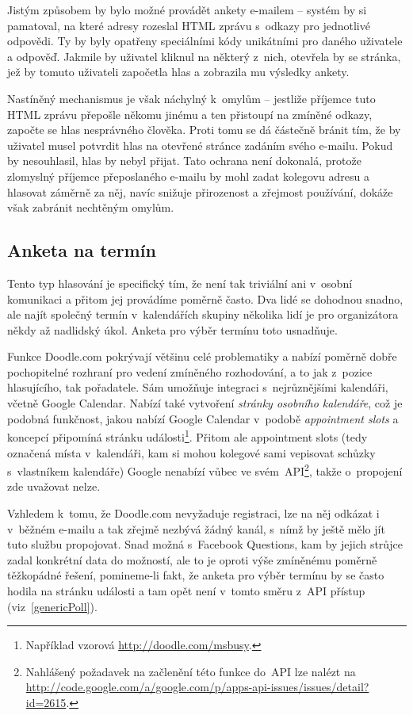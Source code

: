 \documentclass[12pt,oneside,final]{fithesis2}
\begin{document}
Jistým způsobem by bylo možné provádět ankety e-mailem -- systém by si pamatoval, na které adresy rozeslal HTML zprávu s~odkazy pro jednotlivé odpovědi. Ty by byly opatřeny speciálními kódy unikátními pro daného uživatele a odpověď. Jakmile by uživatel kliknul na některý z~nich, otevřela by se stránka, jež by tomuto uživateli započetla hlas a zobrazila mu výsledky ankety.

Nastíněný mechanismus je však náchylný k~omylům -- jestliže příjemce tuto HTML zprávu přepošle někomu jinému a ten přistoupí na zmíněné odkazy, započte se hlas nesprávného člověka. Proti tomu se dá částečně bránit tím, že by uživatel musel potvrdit hlas na otevřené stránce zadáním svého e-mailu. Pokud by nesouhlasil, hlas by nebyl přijat. Tato ochrana není dokonalá, protože zlomyslný příjemce přeposlaného e-mailu by mohl zadat kolegovu adresu a hlasovat záměrně za něj, navíc snižuje přirozenost a zřejmost používání, dokáže však zabránit nechtěným omylům.

\subsection{Anketa na termín}\label{datePoll}
Tento typ hlasování je specifický tím, že není tak triviální ani v~osobní komunikaci a přitom jej provádíme poměrně často. Dva lidé se dohodnou snadno, ale najít společný termín v~kalendářích skupiny několika lidí je pro organizátora někdy až nadlidský úkol. Anketa pro výběr termínu toto usnadňuje.

Funkce Doodle.com pokrývají většinu celé problematiky a nabízí po\-měr\-ně dob\-ře po\-cho\-pi\-tel\-né rozhraní pro vedení zmíněného rozhodování, a to jak z~pozice hlasujícího, tak pořadatele. Sám umožňuje integraci s~nejrůznějšími kalendáři, včetně Google Calendar. Nabízí také vytvoření \emph{stránky osobního kalendáře}, což je podobná funkčnost, jakou nabízí Google Calendar v~podobě \emph{appointment slots} a koncepcí připomíná stránku události\footnote{Například vzorová \url{http://doodle.com/msbusy}.}. Přitom ale appointment slots (tedy označená místa v~kalendáři, kam si mohou kolegové sami vepisovat schůzky s~vlastníkem kalendáře) Google nenabízí vůbec ve svém~API\footnote{Nahlášený požadavek na začlenění této funkce do~API lze nalézt na \url{http://code.google.com/a/google.com/p/apps-api-issues/issues/detail?id=2615}.}, takže o~propojení zde uvažovat nelze.

Vzhledem k~tomu, že Doodle.com nevyžaduje registraci, lze na něj odkázat i v~běžném e-mailu a tak zřejmě nezbývá žádný kanál, s~nímž by ještě mělo jít tuto službu propojovat. Snad možná s~Facebook Questions, kam by jejich strůjce zadal konkrétní data do možností, ale to je oproti výše zmíněnému poměrně těžkopádné řešení, pomineme-li fakt, že anketa pro výběr termínu by se často hodila na stránku události a tam opět není v~tomto směru z~API přístup (viz~\ref{genericPoll}).
\end{document}
